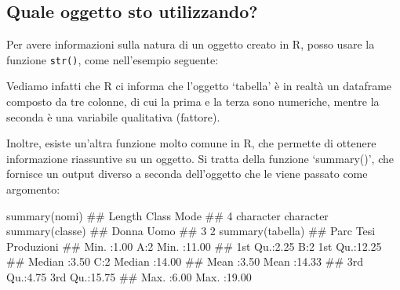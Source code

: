 \documentclass[a4paper,12pt,oneside]{book}
\newenvironment{Shaded}{\begin{snugshade}}{\end{snugshade}}
\newcommand{\DocumentationTok}[1]{#1}
\newcommand{\FunctionTok}[1]{#1}
\newcommand{\NormalTok}[1]{#1}
\begin{document}
\hypertarget{quale-oggetto-sto-utilizzando}{%
\subsection*{Quale oggetto sto utilizzando?}\label{quale-oggetto-sto-utilizzando}}

Per avere informazioni sulla natura di un oggetto creato in R, posso usare la funzione \texttt{str()}, come nell'esempio seguente:

\begin{Shaded}
\end{Shaded}

Vediamo infatti che R ci informa che l'oggetto `tabella' è in realtà un dataframe composto da tre colonne, di cui la prima e la terza sono numeriche, mentre la seconda è una variabile qualitativa (fattore).

Inoltre, esiste un'altra funzione molto comune in R, che permette di ottenere informazione riassuntive su un oggetto. Si tratta della funzione `summary()', che fornisce un output diverso a seconda dell'oggetto che le viene passato come argomento:

\begin{Shaded}
\begin{Highlighting}[]
\FunctionTok{summary}\NormalTok{(nomi)}
\DocumentationTok{\#\#    Length     Class      Mode }
\DocumentationTok{\#\#         4 character character}
\FunctionTok{summary}\NormalTok{(classe)}
\DocumentationTok{\#\# Donna  Uomo }
\DocumentationTok{\#\#     3     2}
\FunctionTok{summary}\NormalTok{(tabella)}
\DocumentationTok{\#\#       Parc      Tesi    Produzioni   }
\DocumentationTok{\#\#  Min.   :1.00   A:2   Min.   :11.00  }
\DocumentationTok{\#\#  1st Qu.:2.25   B:2   1st Qu.:12.25  }
\DocumentationTok{\#\#  Median :3.50   C:2   Median :14.00  }
\DocumentationTok{\#\#  Mean   :3.50         Mean   :14.33  }
\DocumentationTok{\#\#  3rd Qu.:4.75         3rd Qu.:15.75  }
\DocumentationTok{\#\#  Max.   :6.00         Max.   :19.00}
\end{Highlighting}
\end{Shaded}
\end{document}
